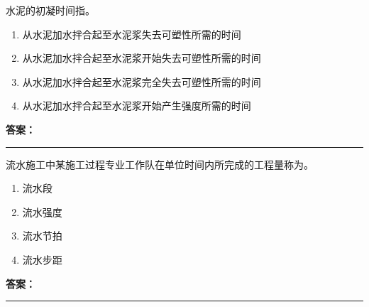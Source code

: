 \documentclass[UTF8,fontset=fandol,11pt]{ctexart}
\newcommand{\answerline}{\textcolor{answerred}{\rule{2.4cm}{0.7pt}}}
\begin{document}
\begin{quizbox}[title={乱序第 58 题｜第四章混凝土结构工程}]

水泥的初凝时间指。\\

\begin{enumerate}[label=\Alph*.]

\item 从水泥加水拌合起至水泥浆失去可塑性所需的时间

\item 从水泥加水拌合起至水泥浆开始失去可塑性所需的时间

\item 从水泥加水拌合起至水泥浆完全失去可塑性所需的时间

\item 从水泥加水拌合起至水泥浆开始产生强度所需的时间

\end{enumerate}

\textbf{\textcolor{answerred}{答案：}} \answerline

\end{quizbox}

\vspace{0.2em}

\begin{quizbox}[title={乱序第 59 题｜第十章流水施工原理}]

流水施工中某施工过程专业工作队在单位时间内所完成的工程量称为。\\

\begin{enumerate}[label=\Alph*.]

\item 流水段

\item 流水强度

\item 流水节拍

\item 流水步距

\end{enumerate}

\textbf{\textcolor{answerred}{答案：}} \answerline

\end{quizbox}

\vspace{0.2em}
\end{document}
